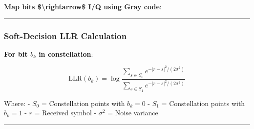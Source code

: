 \textbf{Map bits \$\textbackslash rightarrow\$ I/Q using Gray code}:

\begin{Shaded}
\begin{Highlighting}[]
\OperatorTok{=}\NormalTok{ [}\NormalTok{, }\NormalTok{, }\NormalTok{, }\NormalTok{]  }
\OperatorTok{=}\NormalTok{ bits[}\NormalTok{:}\NormalTok{]}
\OperatorTok{=}\NormalTok{ bits[}\NormalTok{:}\NormalTok{]}
    
\OperatorTok{=}
\OperatorTok{=}
    
\OperatorTok{=} \OperatorTok{*}\OperatorTok{{-}}   
\OperatorTok{=} \OperatorTok{*}\OperatorTok{{-}} 
    
    \OperatorTok{+} \OperatorTok{*}
\end{Highlighting}
\end{Shaded}

\begin{center}\rule{0.5\linewidth}{0.5pt}\end{center}

\subsubsection{Soft-Decision LLR
Calculation}\label{soft-decision-llr-calculation}

\textbf{For bit \(b_k\) in constellation}:

\[
\text{LLR}(b_k) = \log\frac{\sum_{s \in S_0} e^{-|r-s|^2/(2\sigma^2)}}{\sum_{s \in S_1} e^{-|r-s|^2/(2\sigma^2)}}
\]

Where: - \(S_0\) = Constellation points with \(b_k = 0\) - \(S_1\) =
Constellation points with \(b_k = 1\) - \(r\) = Received symbol -
\(\sigma^2\) = Noise variance

\begin{center}\rule{0.5\linewidth}{0.5pt}\end{center}

